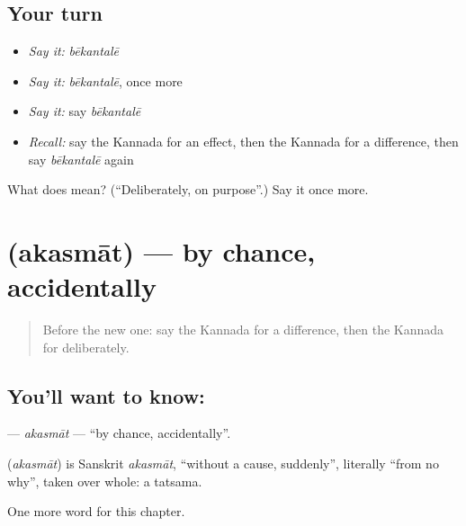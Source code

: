\subsection*{Your turn}
\begin{itemize}
\raggedright
  \item \emph{Say it:} \emph{bēkantalē}
  \item \emph{Say it:} \emph{bēkantalē}, once more
  \item \emph{Say it:} say \emph{bēkantalē}
  \item \emph{Recall:} say the Kannada for an effect, then the Kannada for a difference, then say \emph{bēkantalē} again
\end{itemize}

\begin{tcolorbox}[breakable,colback=teal!4,colframe=teal!35!black,title={Before you move on}]
What does  mean? (\textquotedblleft{}Deliberately, on purpose\textquotedblright{}.) Say it once more.
\end{tcolorbox}
\section[\texorpdfstring{\kn{ಅಕಸ್ಮಾತ್} (akasmāt)}{ಅಕಸ್ಮಾತ್ (akasmāt)}]{ (akasmāt) — by chance, accidentally}

\label{lesson:KA-C178-akasmat}



\begin{quote}
Before the new one: say the Kannada for a difference, then the Kannada for deliberately.
\end{quote}

\subsection*{You'll want to know: }
\textbf{} — \emph{akasmāt} — \textquotedblleft{}by chance, accidentally\textquotedblright{}.

\begin{cousinweb}
\textbf{} (\emph{akasmāt}) is Sanskrit \emph{akasmāt}, \textquotedblleft{}without a cause, suddenly\textquotedblright{}, literally \textquotedblleft{}from no why\textquotedblright{}, taken over whole: a tatsama.
\end{cousinweb}

\begin{grammarlens}[title={What you've built}]
One more word for this chapter.
\end{grammarlens}

